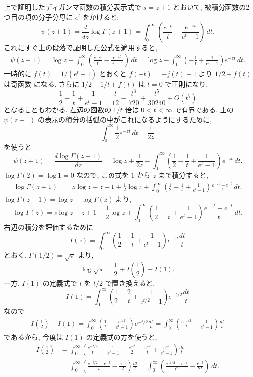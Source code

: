 \documentclass[12pt,twoside]{jarticle}
\theoremstyle{jplain}
\theoremstyle{jplain}
\theoremstyle{jplain}
\numberwithin{theorem}{section}
\numberwithin{equation}{section}
\numberwithin{figure}{section}
\numberwithin{table}{section}
\begin{document}
上で証明したディガンマ函数の積分表示式で $s=z+1$ とおいて, 
被積分函数の2つ目の項の分子分母に $e^t$ をかけると:
\[
\psi(z+1)=\frac{d}{dz}\log\Gamma(z+1)
=\int_0^\infty\left( \frac{e^{-t}}{t}-\frac{e^{-zt}}{e^t-1}\right)\,dt.
\]
これにすぐ上の段落で証明した公式を適用すると,
\begin{align*}
\psi(z+1)
=\log z + \int_0^\infty\left(\frac{e^{-zt}}{t}-\frac{e^{-zt}}{e^t-1}\right)\,dt
=\log z - \int_0^\infty\left(-\frac{1}{t}+\frac{1}{e^t-1}\right)e^{-zt}\,dt.
\end{align*}
一時的に $f(t)=1/(e^t-1)$ とおくと $f(-t)=-f(t)-1$ より $1/2+f(t)$ は奇函数
になる. さらに $1/2-1/t+f(t)$ は $t=0$ で正則になり, 
\[
\frac{1}{2}-\frac{1}{t}+\frac{1}{e^t-1}
=\frac{t}{12}-\frac{t^3}{720}+\frac{t^5}{30240}+O(t^7)
\tag{$*$}
\]
となることもわかる. 左辺の函数の $1/t$ 倍は $0<t<\infty$ で有界である.
上の $\psi(z+1)$ の表示の積分の括弧の中がこれになるようにするために,
\[
\int_0^\infty \frac{1}{2}e^{-zt}\,dt = \frac{1}{2z}
\]
を使うと
\[
\psi(z+1)=\frac{d\log\Gamma(z+1)}{dz}
=\log z+\frac{1}{2z}
-\int_0^\infty\left(\frac{1}{2}-\frac{1}{t}+\frac{1}{e^t-1}\right)e^{-zt}\,dt.
\]
$\log\Gamma(2)=\log 1=0$ なので, この式を $1$ から $z$ まで積分すると, 
\begin{align*}
\log\Gamma(z+1)
&=z\log z-z+1 + \frac{1}{2}\log z
+\int_0^\infty\left(\frac{1}{2}-\frac{1}{t}+\frac{1}{e^t-1}\right)\frac{e^{-zt}-e^{-t}}{t}\,dt.
\end{align*}
$\log\Gamma(z+1)=\log z+\log\Gamma(z)$ より,
\[
\log\Gamma(z)
=z\log z-z+1 - \frac{1}{2}\log z
+\int_0^\infty\left(\frac{1}{2}-\frac{1}{t}+\frac{1}{e^t-1}\right)\frac{e^{-zt}-e^{-t}}{t}\,dt.
\]
右辺の積分を評価するために
\[
I(z)
=\int_0^\infty\left(\frac{1}{2}-\frac{1}{t}+\frac{1}{e^t-1}\right)e^{-zt}\frac{dt}{t}
\]
とおく. $\Gamma(1/2)=\sqrt{\pi}$ より,
\[
\log\sqrt{\pi}=\frac{1}{2}+I\left(\frac{1}{2}\right)-I(1).
\]
一方, $I(1)$ の定義式で $t$ を $t/2$ で置き換えると, 
\[
I(1)
=\int_0^\infty\left(\frac{1}{2}-\frac{2}{t}+\frac{1}{e^{t/2}-1}\right)e^{-t/2}\frac{dt}{t}
\]
なので
\begin{align*}
I\left(\frac{1}{2}\right)-I(1)
=\int_0^\infty\left(\frac{1}{t}-\frac{e^{t/2}}{e^t-1}\right)e^{-t/2}\frac{dt}{t}
=\int_0^\infty\left(\frac{e^{-t/2}}{t}-\frac{1}{e^t-1}\right)\frac{dt}{t}
\end{align*}
であるから, 今度は $I(1)$ の定義式の方を使うと,
\begin{align*}
I\left(\frac{1}{2}\right)
&
=\int_0^\infty\left(
  \frac{e^{-t/2}}{t}-\frac{1}{e^t-1}
 +\frac{e^{-t}}{2}-\frac{e^{-t}}{t}+\frac{e^{-t}}{e^t-1}
\right)\frac{dt}{t}
\\ &
=\int_0^\infty\left(
  \frac{e^{-t/2}-e^{-t}}{t}-\frac{e^{-t}}{2}
\right)\frac{dt}{t}
=\int_0^\infty\left(
  \frac{e^{-t/2}-e^{-t}}{t^2}-\frac{e^{-t}}{2t}
\right)\,dt.
\end{align*}
\end{document}
